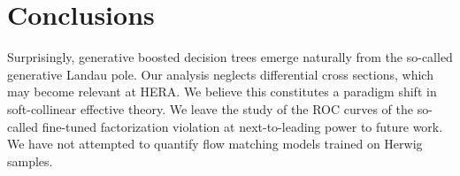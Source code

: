 \section{Conclusions}\label{sec:conclusions}

Surprisingly, generative boosted decision trees emerge naturally from
the so-called generative Landau pole. Our analysis neglects differential
cross sections, which may become relevant at HERA. We believe this
constitutes a paradigm shift in soft-collinear effective theory. We
leave the study of the ROC curves of the so-called fine-tuned
factorization violation at next-to-leading power to future work. We have
not attempted to quantify flow matching models trained on Herwig
samples.

